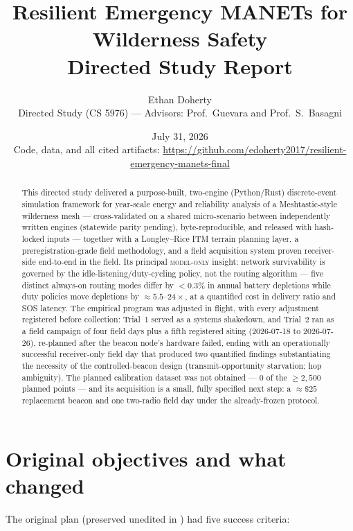 \documentclass[11pt]{article}
\title{\textbf{Resilient Emergency MANETs for Wilderness Safety}\\[4pt]
\large Directed Study Report}
\author{Ethan Doherty\\\small Directed Study (CS 5976) --- Advisors: Prof.~Guevara and Prof.~S.~Basagni}
\date{July 31, 2026\\[3pt]
\small Code, data, and all cited artifacts:
\url{https://github.com/edoherty2017/resilient-emergency-manets-final}}
\newcommand{\modelonly}{\textsc{model-only}}
\begin{document}
\maketitle

\begin{abstract}
\noindent This directed study delivered a purpose-built, two-engine
(Python/Rust) discrete-event simulation framework for year-scale energy and
reliability analysis of a Meshtastic-style wilderness mesh --- cross-validated on a shared micro-scenario between independently written engines (statewide parity pending), byte-reproducible, and released with hash-locked inputs --- together with a Longley--Rice ITM terrain planning
layer, a preregistration-grade field methodology, and a field acquisition system proven receiver-side end-to-end in the field. Its principal \modelonly{} insight:
network survivability is governed by the idle-listening/duty-cycling policy,
not the routing algorithm --- five distinct always-on routing modes differ by
$<0.3\%$ in annual battery depletions while duty policies move depletions by
${\approx}5.5$--$24\times$, at a quantified cost in delivery ratio and SOS
latency. The empirical program was adjusted in flight, with every adjustment
registered before collection: Trial~1 served as a systems shakedown, and
Trial~2 ran as a field campaign of four field days plus a fifth registered
siting (2026-07-18 to 2026-07-26), re-planned after the beacon node's
hardware failed, ending with an operationally successful receiver-only field
day that produced two quantified findings substantiating the necessity of the controlled-beacon design (transmit-opportunity starvation; hop ambiguity). The planned
calibration dataset was not obtained --- 0 of the ${\geq}2{,}500$ planned points --- and its acquisition is a small, fully specified next step: a
${\approx}\$25$ replacement beacon and one two-radio field day under the
already-frozen protocol.
\end{abstract}

\section{Original objectives and what changed}\label{sec:objectives}

The original plan (preserved unedited in )
had five success criteria:
\end{document}
